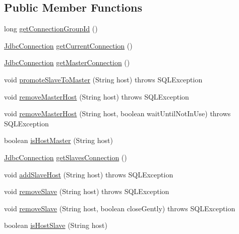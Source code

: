 \subsection*{Public Member Functions}
\begin{DoxyCompactItemize}
\item 
long \mbox{\hyperlink{interfacecom_1_1mysql_1_1cj_1_1jdbc_1_1ha_1_1_replication_connection_a5010d921918f0ed6d8776fe44541a37c}{get\+Connection\+Group\+Id}} ()
\item 
\mbox{\hyperlink{interfacecom_1_1mysql_1_1cj_1_1jdbc_1_1_jdbc_connection}{Jdbc\+Connection}} \mbox{\hyperlink{interfacecom_1_1mysql_1_1cj_1_1jdbc_1_1ha_1_1_replication_connection_a0bfb42722305b18722f782067f85d538}{get\+Current\+Connection}} ()
\item 
\mbox{\hyperlink{interfacecom_1_1mysql_1_1cj_1_1jdbc_1_1_jdbc_connection}{Jdbc\+Connection}} \mbox{\hyperlink{interfacecom_1_1mysql_1_1cj_1_1jdbc_1_1ha_1_1_replication_connection_ac4c0ab9593304c8a6928e376ac5d78d8}{get\+Master\+Connection}} ()
\item 
void \mbox{\hyperlink{interfacecom_1_1mysql_1_1cj_1_1jdbc_1_1ha_1_1_replication_connection_abeccff634ae5dc9f96295b012c458500}{promote\+Slave\+To\+Master}} (String host)  throws S\+Q\+L\+Exception
\item 
void \mbox{\hyperlink{interfacecom_1_1mysql_1_1cj_1_1jdbc_1_1ha_1_1_replication_connection_a7e1cf8606d5b42c57ce5dfae63d981e3}{remove\+Master\+Host}} (String host)  throws S\+Q\+L\+Exception
\item 
void \mbox{\hyperlink{interfacecom_1_1mysql_1_1cj_1_1jdbc_1_1ha_1_1_replication_connection_a47341136bcee35fd889a2d568e375756}{remove\+Master\+Host}} (String host, boolean wait\+Until\+Not\+In\+Use)  throws S\+Q\+L\+Exception
\item 
boolean \mbox{\hyperlink{interfacecom_1_1mysql_1_1cj_1_1jdbc_1_1ha_1_1_replication_connection_a4b69699e70dfff96adec746e2c6e7254}{is\+Host\+Master}} (String host)
\item 
\mbox{\hyperlink{interfacecom_1_1mysql_1_1cj_1_1jdbc_1_1_jdbc_connection}{Jdbc\+Connection}} \mbox{\hyperlink{interfacecom_1_1mysql_1_1cj_1_1jdbc_1_1ha_1_1_replication_connection_aa5f54ad265b6462d4d2b13ae3b4cdc5c}{get\+Slaves\+Connection}} ()
\item 
void \mbox{\hyperlink{interfacecom_1_1mysql_1_1cj_1_1jdbc_1_1ha_1_1_replication_connection_ace5387750423fcebedca50789d44a26c}{add\+Slave\+Host}} (String host)  throws S\+Q\+L\+Exception
\item 
void \mbox{\hyperlink{interfacecom_1_1mysql_1_1cj_1_1jdbc_1_1ha_1_1_replication_connection_a26c4c17241b8e9169e88484ba26bf081}{remove\+Slave}} (String host)  throws S\+Q\+L\+Exception
\item 
void \mbox{\hyperlink{interfacecom_1_1mysql_1_1cj_1_1jdbc_1_1ha_1_1_replication_connection_ac4e3f61d87c2f40d760917c843b4a4aa}{remove\+Slave}} (String host, boolean close\+Gently)  throws S\+Q\+L\+Exception
\item 
boolean \mbox{\hyperlink{interfacecom_1_1mysql_1_1cj_1_1jdbc_1_1ha_1_1_replication_connection_acd55ae42ba3c57522fc995a80da26675}{is\+Host\+Slave}} (String host)
\end{DoxyCompactItemize}


